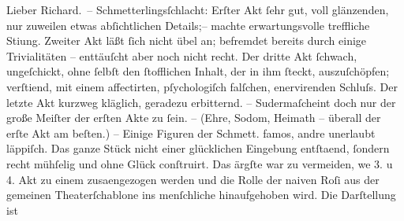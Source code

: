 \pstart{}Lieber Richard. –\pend\vspace{0.5em}
\pstart
           Schmetterlingsſchlacht: Erſter Akt ſehr gut,
               voll glänzenden, nur zuweilen etwas abſichtlichen Details;– machte erwartungsvolle
               treffliche Sti{\geminationm}ung. Zweiter Akt läßt ſich nicht übel an;
               befremdet bereits durch einige Trivialitäten – enttäuſcht aber noch nicht recht. Der
               dritte Akt {\pb}ſchwach, ungeſchickt, ohne ſelbſt den
               ſtofflichen Inhalt, der in ihm ſteckt, auszuſchöpfen; verſti{\geminationm}end, mit einem affectirten, pſychologiſch falſchen,
               enervirenden Schluſs. Der letzte Akt kurzweg kläglich, geradezu erbitternd. – Suderma{\geminationn}ſcheint doch nur der große Meiſter der erſten Akte
               zu ſein. – (Ehre, Sodom, Heimath – {\pb}überall der erſte Akt am beſten.) – Einige Figuren der
                  Schmett. famos, andre unerlaubt läppiſch. Das
               ganze Stück nicht einer glücklichen Eingebung entſta{\geminationm}end, ſondern recht mühſelig und ohne Glück conſtruirt. Das ärgſte war zu vermeiden,
                  we{\geminationn} 3. u 4. Akt zu einem zusa{\geminationm}enge{\pb}zogen werden und
               die Rolle der naiven Roſi aus
               der gemeinen Theaterſchablone ins menſchliche hinaufgehoben wird. Die Darſtellung ist
